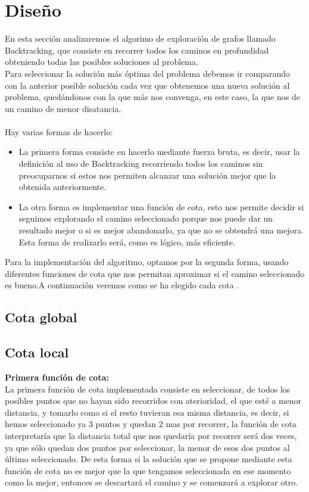 \documentclass[11pt,openany]{book}
\begin{document}
\section{Diseño}   
En esta sección analizaremos el algorimo de exploración de grafos llamado Backtracking, que consiste en recorrer todos los caminos en profundidad obteniendo todas
las posibles soluciones al problema. \\
Para seleccionar la solución más óptima del problema debemos ir comparando con la anterior posible solución  cada vez que obtenemos una nueva solución al problema, quedándonos con la que más nos
convenga, en este caso, la que nos de un camino de menor disatancia.
\\ \\
Hay varias formas de hacerlo:
\begin{itemize}
      \item La primera forma consiste en hacerlo mediante fuerza bruta, es decir, usar la definición al uso de Backtracking recorriendo todos los caminos sin preocuparnos
      si estos nos permiten alcanzar una solución mejor que la obtenida anteriormente.
      \item La otra forma es implementar una función de cota, esto nos permite decidir si seguimos explorando el camino seleccionado porque nos puede dar un resultado mejor
      o si es mejor abandonarlo, ya que no se obtendrá una mejora.
      Esta forma de realizarlo será, como es lógico, más eficiente.
\end{itemize}

Para la implementación del algoritmo, optamos por la segunda forma, usando diferentes funciones de cota que nos permitan aproximar si el camino seleccionado es bueno.A continuación
veremos como se ha elegido cada cota .
\subsection{Cota global}
\subsection{Cota local}
\textbf{Primera función de cota:} \\
    La primera función de cota implementada consiste en seleccionar, de todos los posibles puntos  que no hayan sido recorridos con aterioridad, el que esté a menor distancia, y tomarlo como si el resto tuvieran esa misma distancia,
    es decir, si hemos seleccionado ya 3 puntos y quedan 2 mas por recorrer, la función de cota interpretaría que la distancia total que nos quedaría por recorrer será dos veces, ya que sólo quedan dos puntos por seleccionar, la menor de esos dos puntos al último seleccionado.
    De esta forma si la solución que se propone mediante esta función de cota no es mejor que la que tengamos seleccionada en ese momento como la mejor, entonces se descartará el camino y se comenzará a explorar otro.
\end{document}
